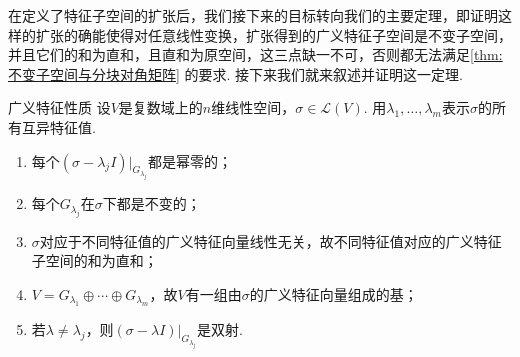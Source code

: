 在定义了特征子空间的扩张后，我们接下来的目标转向我们的主要定理，即证明这样的扩张的确能使得对任意线性变换，扩张得到的广义特征子空间是不变子空间，并且它们的和为直和，且直和为原空间，这三点缺一不可，否则都无法满足\autoref{thm:不变子空间与分块对角矩阵} 的要求. 接下来我们就来叙述并证明这一定理.
\begin{theorem}{}{广义特征性质}
    设$V$是复数域上的$n$维线性空间，$\sigma\in \mathcal{L}(V)$. 用$\lambda_1,\ldots,\lambda_m$表示$\sigma$的所有互异特征值.
    \begin{enumerate}[label=(\arabic*)]
        \item \label{item:16:广义特征性质:1}
              每个$(\sigma-\lambda_j I)\vert_{G_{\lambda_j}}$都是幂零的；

        \item 每个$G_{\lambda_j}$在$\sigma$下都是不变的；

        \item $\sigma$对应于不同特征值的广义特征向量线性无关，故不同特征值对应的广义特征子空间的和为直和；

        \item \label{item:16:广义特征性质:4}
              $V=G_{\lambda_1}\oplus\cdots\oplus G_{\lambda_m}$，故$V$有一组由$\sigma$的广义特征向量组成的基；

        \item 若$\lambda\neq\lambda_j$，则$(\sigma-\lambda I)\vert_{G_{\lambda_j}}$是双射.
    \end{enumerate}
\end{theorem}

